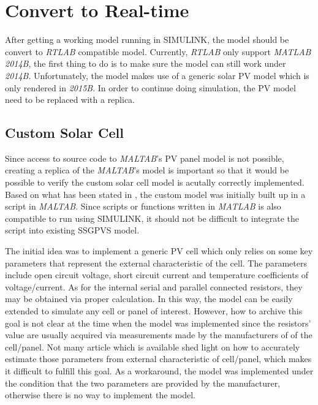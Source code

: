 \section{Convert to Real-time}\label{sec:convert_rt}
After getting a working model running in SIMULINK, the model should be convert to \textit{RTLAB} compatible model. Currently, \textit{RTLAB} only support \textit{MATLAB 2014B}, the first thing to do is to make sure the model can still work under \textit{2014B}. Unfortunately, the model makes use of a generic solar \gls{PV} model which is only rendered in \textit{2015B}. In order to continue doing simulation, the \gls{PV} model need to be replaced with a replica.

\subsection{Custom Solar Cell}
Since access to source code to \textit{MALTAB}'s PV panel model is not possible, creating a replica of the \textit{MALTAB}'s model is important so that it would be possible to verify the custom solar cell model is acutally correctly implemented. Based on what has been stated in , the custom model was initially built up in a script in \textit{MALTAB}. Since scripts or functions written in \textit{MATLAB} is also compatible to run using SIMULINK, it should not be difficult to integrate the script into existing \gls{SSGPVS} model. 

The initial idea was to implement a generic \gls{PV} cell which only relies on some key parameters that represent the external characteristic of the cell. The parameters include open circuit voltage, short circuit current and temperature coefficients of voltage/current. As for the internal serial and parallel connected resistors, they may be obtained via proper calculation. In this way, the model can be easily extended to simulate any cell or panel of interest. However, how to archive this goal is not clear at the time when the model was implemented since the resistors' value are usually acquired via measurements made by the manufacturers of of the cell/panel. Not many article which is available shed light on how to accurately estimate those parameters from external characteristic of cell/panel, which makes it difficult to fulfill this goal. As a workaround, the model was implemented under the condition that the two parameters are provided by the manufacturer, otherwise there is no way to implement the model. 

